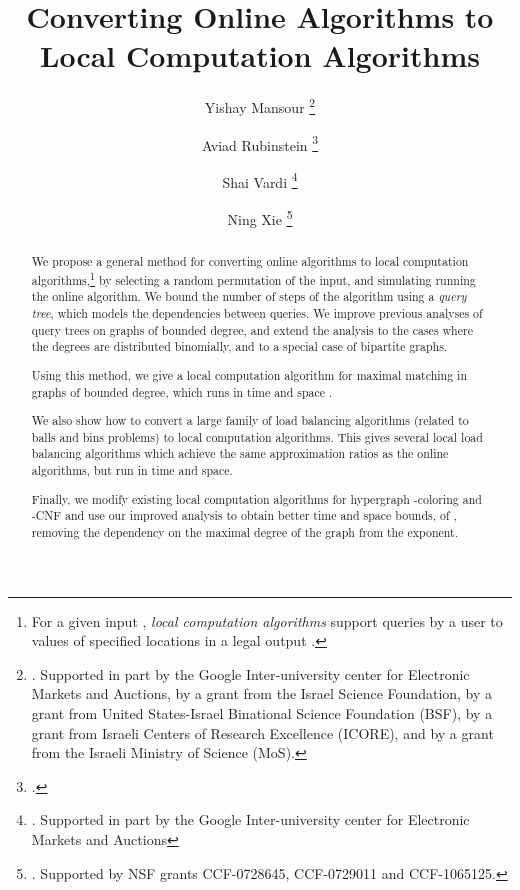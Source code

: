 \documentclass[english, oribibl]{llncs}
\begin{document}
\title{Converting Online Algorithms to Local Computation Algorithms}
\author{
Yishay Mansour 
\thanks{. Supported in part by the Google Inter-university center
for Electronic Markets and Auctions, by a grant from the Israel
Science Foundation, by a grant from United States-Israel Binational
Science Foundation (BSF), by a grant from Israeli Centers of Research Excellence (ICORE), and by a grant from the Israeli Ministry
of Science (MoS).}
\and
Aviad Rubinstein
\thanks{ .}
\and
Shai Vardi
\thanks{. Supported in part by the Google Inter-university center
for Electronic Markets and Auctions }
\and
Ning Xie
\thanks{. Supported by NSF grants CCF-0728645, CCF-0729011 and CCF-1065125.}
}


\date{}

\setcounter{page}{1}
\setcounter{secnumdepth}{3}
\maketitle

\begin{abstract}

We propose a general method for converting online algorithms to local computation algorithms,\footnote{For a given input , \emph{local computation algorithms} support queries by a user to values of specified locations  in a legal output .} by selecting a random permutation of the input, and simulating running the online algorithm. We bound the number of steps of the algorithm using a \emph{query tree}, which models the dependencies between queries. We improve previous analyses of query trees on graphs of bounded degree, and extend the analysis to the cases where the degrees are distributed binomially, and to a special case of bipartite graphs.



Using this method, we give a local computation algorithm for maximal matching in graphs of bounded degree, which runs in time and space .

We also show how to convert a large family of load balancing algorithms (related to balls and bins problems) to local computation algorithms. This gives several local load balancing algorithms which achieve the same approximation ratios as the online algorithms, but run in  time and space.

Finally, we modify existing local computation algorithms for hypergraph -coloring and -CNF and use our improved analysis to obtain better time and space bounds, of , removing the dependency on the maximal degree of the graph from the exponent.
\end{abstract}
\end{document}
